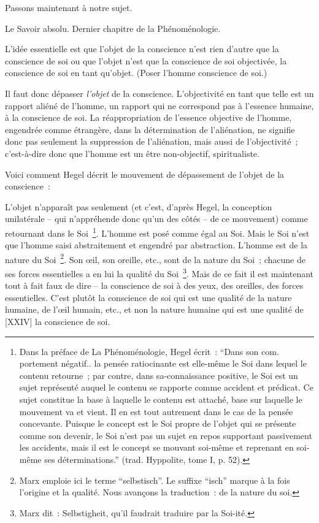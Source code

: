 \documentclass[french,twoside]{book} %
\begin{document}
Passons maintenant à notre sujet.\par
Le Savoir absolu. Dernier chapitre de la Phénoménologie.\par
L’idée essentielle est que l’objet de la conscience n’est rien d’autre que la conscience de soi ou que l’objet n’est que la conscience de soi objectivée, la conscience de soi en tant qu’objet. (Poser l’homme conscience de soi.)\par
Il faut donc dépasser \emph{l’objet} de la conscience. L’objectivité en tant que telle est un rapport aliéné de l’homme, un rapport qui ne correspond pas à l’essence humaine, à la conscience de soi. La réappropriation de l’essence objective de l’homme, engendrée comme étrangère, dans la détermination de l’aliénation, ne signifie donc pas seulement la suppression de l’aliénation, mais aussi de l’objectivité ; c’est-à-dire donc que l’homme est un être non-objectif, spiritualiste.\par
Voici comment Hegel décrit le mouvement de dépassement de l’objet de la conscience :\par
L’objet n’apparaît pas seulement (et c’est, d’après Hegel, la conception unilatérale – qui n’appréhende donc qu’un des côtés – de ce mouvement) comme retournant dans le Soi \footnote{Dans la préface de La Phénoménologie, Hegel écrit : “Dans son com. portement négatif.. la pensée ratiocinante est elle-même le Soi dans lequel le contenu retourne ; par contre, dans sa-connaissance positive, le Soi est un sujet représenté auquel le contenu se rapporte comme accident et prédicat. Ce sujet constitue la base à laquelle le contenu est attaché, base sur laquelle le mouvement va et vient. Il en est tout autrement dans le cas de la pensée concevante. Puisque le concept est le Soi propre de l’objet qui se présente comme son devenir, le Soi n’est pas un sujet en repos supportant passivement les accidents, mais il est le concept se mouvant soi-même et reprenant en soi-même ses déterminations.” (trad. Hyppolite, tome I, p. 52).}. L’homme est posé comme égal au Soi. Mais le Soi n’est que l’homme saisi abstraitement et engendré par abstraction. L’homme est de la nature du Soi \footnote{Marx emploie ici le terme “selbstisch”. Le suffixe “isch” marque à la fois l’origine et la qualité. Nous avançons la traduction : de la nature du soi.}. Son œil, son oreille, etc., sont de la nature du Soi ; chacune de ses forces essentielles a en lui la qualité du Soi \footnote{Marx dit : Selbstigheit, qu’il faudrait traduire par la Soi-ité.}. Mais de ce fait il est maintenant tout à fait faux de dire – la conscience de soi à des yeux, des oreilles, des forces essentielles. C’est plutôt la conscience de soi qui est une qualité de la nature humaine, de l’œil humain, etc., et non la nature humaine qui est une qualité de [XXIV] la conscience de soi.\par
\end{document}
